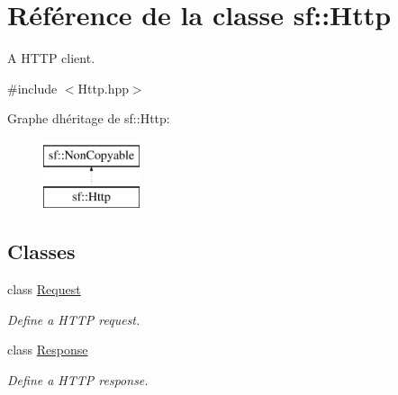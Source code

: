 \hypertarget{classsf_1_1Http}{}\section{Référence de la classe sf\+:\+:Http}
\label{classsf_1_1Http}


A H\+T\+TP client.  




{\ttfamily \#include $<$Http.\+hpp$>$}

Graphe d\textquotesingle{}héritage de sf\+:\+:Http\+:\begin{figure}[H]
\begin{center}
\leavevmode
\includegraphics[height=2.000000cm]{classsf_1_1Http}
\end{center}
\end{figure}
\subsection*{Classes}
\begin{DoxyCompactItemize}
\item 
class \hyperlink{classsf_1_1Http_1_1Request}{Request}
\begin{DoxyCompactList}\small\item\em Define a H\+T\+TP request. \end{DoxyCompactList}\item 
class \hyperlink{classsf_1_1Http_1_1Response}{Response}
\begin{DoxyCompactList}\small\item\em Define a H\+T\+TP response. \end{DoxyCompactList}\end{DoxyCompactItemize}
